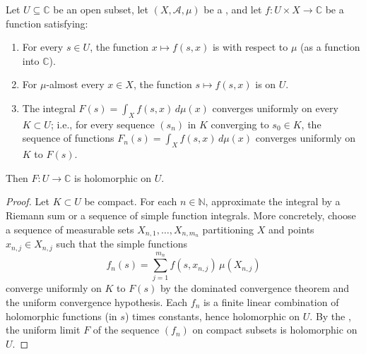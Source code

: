 \begin{lemma} \label{lemma:holomorphic_function_defined_by_parameter_integral_with_uniform_convergence}
Let $U \subseteq \mathbb{C}$ be an open subset, let $(X, \mathcal{A}, \mu)$ be a , and let $f : U \times X \to \mathbb{C}$ be a function satisfying:
\begin{enumerate}
    \item For every $s \in U$, the function $x \mapsto f(s, x)$ is  with respect to $\mu$ (as a function into $\mathbb{C}$).
    \item For $\mu$-almost every $x \in X$, the function $s \mapsto f(s, x)$ is  on $U$.
    \item The integral $F(s) = \int_X f(s, x) \, d\mu(x)$ converges uniformly on every  $K \subset U$; i.e., for every sequence $(s_n)$ in $K$ converging to $s_0 \in K$, the sequence of functions $F_n(s) = \int_X f(s, x) \, d\mu(x)$ converges uniformly on $K$ to $F(s)$.
\end{enumerate}
Then $F : U \to \mathbb{C}$ is holomorphic on $U$.
\end{lemma}
\begin{proof}
Let $K \subset U$ be compact. For each $n \in \mathbb{N}$, approximate the integral by a Riemann sum or a sequence of simple function integrals. More concretely, choose a sequence of measurable sets $X_{n,1}, \dots, X_{n,m_n}$ partitioning $X$ and points $x_{n,j} \in X_{n,j}$ such that the simple functions
$$f_n(s) = \sum_{j=1}^{m_n} f(s, x_{n,j}) \, \mu(X_{n,j})$$
converge uniformly on $K$ to $F(s)$ by the dominated convergence theorem and the uniform convergence hypothesis. Each $f_n$ is a finite linear combination of holomorphic functions (in $s$) times constants, hence holomorphic on $U$. By the , the uniform limit $F$ of the sequence $(f_n)$ on compact subsets is holomorphic on $U$.
\end{proof}